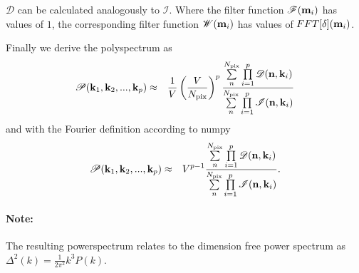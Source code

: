 \documentclass[twoside,10pt]{article}
\begin{document}
\begin{multicols}{2}
$\mathscr{D}$ can be calculated analogously to $\mathscr{I}$. Where the filter function $\mathscr{F}({\bf m}_i)$ has values of $1$, the corresponding filter function $\mathscr{W}({\bf m}_i)$ has values of $FFT[\delta]({\bf m}_i)$. 

Finally we derive the polyspectrum as
\begin{eqnarray}
 \mathscr{P}({\bf k}_1, {\bf k}_2, ..., {\bf k}_p) &\approx& \frac{1}{V} \left(\frac{V}{N_\mathrm{pix}}\right)^{p}  \frac{\sum\limits_{n}^{N_\mathrm{pix}} \prod\limits_{i=1}^p \mathscr{D}({\bf n}, {\bf k}_i)}{\sum\limits_{n}^{N_\mathrm{pix}} \prod\limits_{i=1}^p \mathscr{I}({\bf n}, {\bf k}_i)}
\end{eqnarray}
and with the Fourier definition according to {\sc numpy}
\begin{eqnarray}
 \mathscr{P}({\bf k}_1, {\bf k}_2, ..., {\bf k}_p) &\approx& V^{p-1}  \frac{\sum\limits_{n}^{N_\mathrm{pix}} \prod\limits_{i=1}^p \mathscr{D}({\bf n}, {\bf k}_i)}{\sum\limits_{n}^{N_\mathrm{pix}} \prod\limits_{i=1}^p \mathscr{I}({\bf n}, {\bf k}_i)}.
\end{eqnarray}

\paragraph{Note:} The resulting powerspectrum relates to the dimension free power spectrum as $\Delta^2(k)= \frac{1}{2\pi^2} k^3 P(k)$.


\begin{thebibliography}{99} %

 
\end{thebibliography}


\end{multicols}
\end{document}
